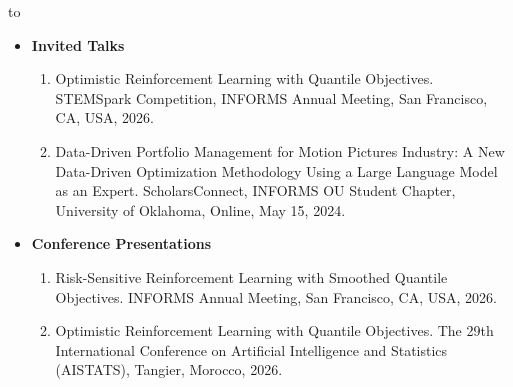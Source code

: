 \documentclass[9pt,a4paper]{extarticle}
\newcommand{\SectionFont}
    {\fontsize{11}{12.5}\selectfont}
\newcommand{\CategoryFont}
    {\fontsize{9.5}{10.35}\selectfont}
\newcommand{\BodyFont}
    {\fontsize{8.5}{9.30}\selectfont}
\newlength{\CVSectionBefore}
\newlength{\CVSectionAfter}
\newcommand{\cvsection}[1]{%
    \par
    \vspace{\CVSectionBefore}%
    \noindent
    \hbox to \textwidth{%
        {\SectionFont\bfseries\color{black}#1}%
        \hspace{0.40em}%
        \hrulefill
    }%
    \par
    \vspace{\CVSectionAfter}%
}
\newcommand{\cvcategory}[1]{%
    {\CategoryFont\bfseries\color{CVBody}#1}%
}
\newenvironment{cvcatlist}{%
    \begin{itemize}[
        leftmargin=0pt,
        labelsep=0pt,
        label={},
        topsep=0pt,
        itemsep=-0.5pt,
        parsep=0pt,
        partopsep=0pt
    ]
}{%
    \end{itemize}
}
\newenvironment{cvconflist}{%
    \begin{enumerate}[
        leftmargin=0.24in,
        labelsep=0.04in,
        label={\BodyFont\color{CVBody}\arabic*.},
        start=1,
        topsep=-0.8pt,
        itemsep=-0.8pt,
        parsep=0pt,
        partopsep=0pt
    ]
}{%
    \end{enumerate}
}
\newcommand{\confitem}[4]{%
    \item\relax
    {\BodyFont\color{CVBody}%
     #1. #2, #3, #4.}%
}
\newcommand{\skillrow}[2]{%
    {\BodyFont\color{CVText}
     \textbf{#1}\ #2}%
    \par
    \vspace{-0.20pt}%
}
\begin{document}






\cvsection{Presentations}

\begin{cvcatlist}



\item \cvcategory{Invited Talks}

\begin{cvconflist}

\confitem
{Optimistic Reinforcement Learning with Quantile Objectives}
{STEMSpark Competition, INFORMS Annual Meeting}
{San Francisco, CA, USA}
{2026}

\confitem
{Data-Driven Portfolio Management for Motion Pictures Industry:
A New Data-Driven Optimization Methodology Using a Large Language Model as an Expert}
{ScholarsConnect, INFORMS OU Student Chapter, University of Oklahoma}
{Online}
{May 15, 2024}

\end{cvconflist}



\item \cvcategory{Conference Presentations}

\begin{cvconflist}

\confitem
{Risk-Sensitive Reinforcement Learning with Smoothed Quantile Objectives}
{INFORMS Annual Meeting}
{San Francisco, CA, USA}
{2026}

\confitem
{Optimistic Reinforcement Learning with Quantile Objectives}
{The 29th International Conference on Artificial Intelligence and Statistics (AISTATS)}
{Tangier, Morocco}
{2026}


\end{cvconflist}
\end{cvcatlist}
\end{document}
